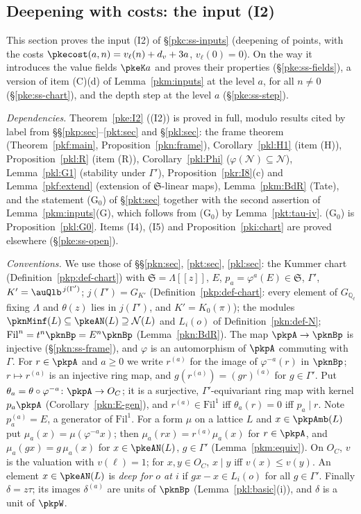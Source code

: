 \documentclass[10pt]{amsart}
\theoremstyle{definition}
\theoremstyle{remark}
\newcommand{\Q}{\mathbb Q}
\begin{document}
\subsection{Deepening with costs: the input (I2)}\label{pke:sec}

This section proves the input (I2) of \S\ref{pkc:ss-inputs} (deepening of points, with the costs
$\pkecost(a,n)=v_\ell(n)+d_v+3a$, $v_\ell(0)=0$). On the way it introduces the value fields
$\pkeK a$ and proves their properties (\S\ref{pke:ss-fields}), a version of item (C)(d) of
Lemma~\ref{pkm:inputs} at the level $a$, for all $n\ne0$ (\S\ref{pke:ss-chart}), and the depth step at
the level $a$ (\S\ref{pke:ss-step}).

\emph{Dependencies.} Theorem~\ref{pke:I2} ((I2)) is proved in full, modulo results cited by label from
\S\S\ref{pkp:sec}--\ref{pkt:sec} and \S\ref{pkl:sec}: the frame theorem (Theorem~\ref{pkf:main},
Proposition~\ref{pkn:frame}), Corollary~\ref{pkl:H1} (item (H)), Proposition~\ref{pkl:R} (item (R)),
Corollary~\ref{pkl:Phi} ($\varphi(\mathcal N)\subseteq\mathcal N$), Lemma~\ref{pkl:G1} (stability under
$\Gamma'$), Proposition~\ref{pkr:I8}(c) and Lemma~\ref{pkf:extend} (extension of
$\mathfrak S$-linear maps), Lemma~\ref{pkm:BdR} (Tate), and the statement (G$_0$) of \S\ref{pkt:sec}
together with the second assertion of Lemma~\ref{pkm:inputs}(G), which follows from (G$_0$) by
Lemma~\ref{pkt:tau-iv}. (G$_0$) is Proposition~\ref{pkl:G0}. Items (I4), (I5) and
Proposition~\ref{pki:chart} are proved elsewhere (\S\ref{pke:ss-open}).

\emph{Conventions.} We use those of \S\S\ref{pkn:sec}, \ref{pkt:sec}, \ref{pkl:sec}: the Kummer chart
(Definition~\ref{pkp:def-chart}) with $\mathfrak S=\Lambda[[z]]$, $E$, $p_a=\varphi^a(E)\in\mathfrak S$,
$\Gamma'$, $K'=\auQlb^{\,j(\Gamma')}$; $j(\Gamma')=G_{K'}$ (Definition~\ref{pkp:def-chart}: every element
of $G_{\Q_\ell}$ fixing $\Lambda$ and $\theta(z)$ lies in $j(\Gamma')$, and $K'=K_0(\pi)$); the modules
$\pknMinf(L)\subseteq\pkeAN(L)\supseteq\mathcal N(L)$ and $L_i(o)$ of Definition~\ref{pkn:def-N};
$\mathrm{Fil}^n=t^n\pknBp=E^n\pknBp$ (Lemma~\ref{pkn:BdR}). The map $\pkpA\to\pknBp$ is injective
(\S\ref{pkn:ss-frame}), and $\varphi$ is an automorphism of $\pkpA$ commuting with $\Gamma$. For
$r\in\pkpA$ and $a\ge0$ we write $r^{(a)}$ for the image of $\varphi^{-a}(r)$ in $\pknBp$; $r\mapsto r^{(a)}$
is an injective ring map, and $g(r^{(a)})=(gr)^{(a)}$ for $g\in\Gamma'$. Put $\theta_a=\theta\circ
\varphi^{-a}\colon\pkpA\to O_C$; it is a surjective, $\Gamma'$-equivariant ring map with kernel $p_a\pkpA$
(Corollary~\ref{pkn:E-gen}), and $r^{(a)}\in\mathrm{Fil}^1$ iff $\theta_a(r)=0$ iff $p_a\mid r$. Note
$p_a^{(a)}=E$, a generator of $\mathrm{Fil}^1$. For a form $\mu$ on a lattice $L$ and $x\in\pkpAmb(L)$
put $\mu_a(x)=\mu(\varphi^{-a}x)$; then $\mu_a(rx)=r^{(a)}\mu_a(x)$ for $r\in\pkpA$, and
$\mu_a(gx)=g\,\mu_a(x)$ for $x\in\pkeAN(L)$, $g\in\Gamma'$ (Lemma~\ref{pkm:equiv}). On $O_C$, $v$ is the
valuation with $v(\ell)=1$; for $x,y\in O_C$, $x\mid y$ iff $v(x)\le v(y)$. An element $x\in\pkeAN(L)$ is
\emph{deep for $o$ at $i$} if $gx-x\in L_i(o)$ for all $g\in\Gamma'$. Finally $\delta=z\tau$; its images
$\delta^{(a)}$ are units of $\pknBp$ (Lemma~\ref{pkl:basic}(i)), and $\delta$ is a unit of $\pkpW$.
\end{document}
